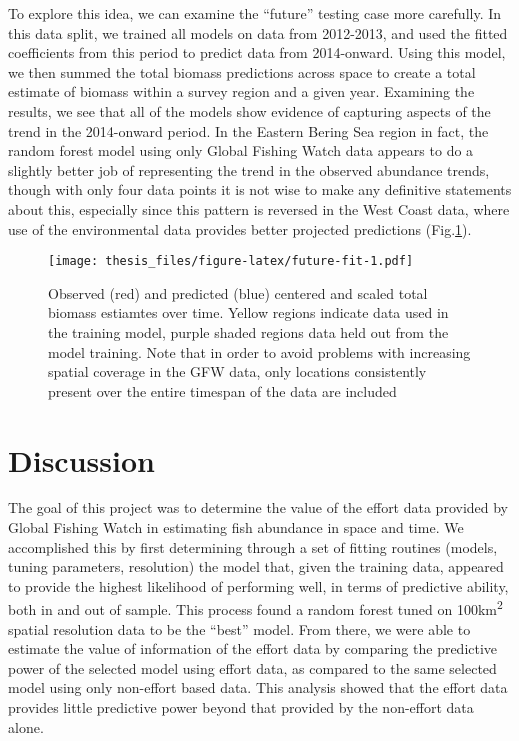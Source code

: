 \documentclass[twoside,12pt,final]{ucthesis-CA2012}
\begin{document}
\begin{ucmainmatter}
To explore this idea, we can examine the ``future'' testing case more
carefully. In this data split, we trained all models on data from
2012-2013, and used the fitted coefficients from this period to predict
data from 2014-onward. Using this model, we then summed the total
biomass predictions across space to create a total estimate of biomass
within a survey region and a given year. Examining the results, we see
that all of the models show evidence of capturing aspects of the trend
in the 2014-onward period. In the Eastern Bering Sea region in fact, the
random forest model using only Global Fishing Watch data appears to do a
slightly better job of representing the trend in the observed abundance
trends, though with only four data points it is not wise to make any
definitive statements about this, especially since this pattern is
reversed in the West Coast data, where use of the environmental data
provides better projected predictions (Fig.\ref{fig:future-fit}).
\begin{figure}
\centering
\texttt{[image: thesis\_files/figure-latex/future-fit-1.pdf]}
\caption{\label{fig:future-fit}Observed (red) and predicted (blue) centered
and scaled total biomass estiamtes over time. Yellow regions indicate
data used in the training model, purple shaded regions data held out
from the model training. Note that in order to avoid problems with
increasing spatial coverage in the GFW data, only locations consistently
present over the entire timespan of the data are included}
\end{figure}
\section{Discussion}\label{discussion}

The goal of this project was to determine the value of the effort data
provided by Global Fishing Watch in estimating fish abundance in space
and time. We accomplished this by first determining through a set of
fitting routines (models, tuning parameters, resolution) the model that,
given the training data, appeared to provide the highest likelihood of
performing well, in terms of predictive ability, both in and out of
sample. This process found a random forest tuned on
100km\textsuperscript{2} spatial resolution data to be the ``best''
model. From there, we were able to estimate the value of information of
the effort data by comparing the predictive power of the selected model
using effort data, as compared to the same selected model using only
non-effort based data. This analysis showed that the effort data
provides little predictive power beyond that provided by the non-effort
data alone.


\end{ucmainmatter}
\end{document}
